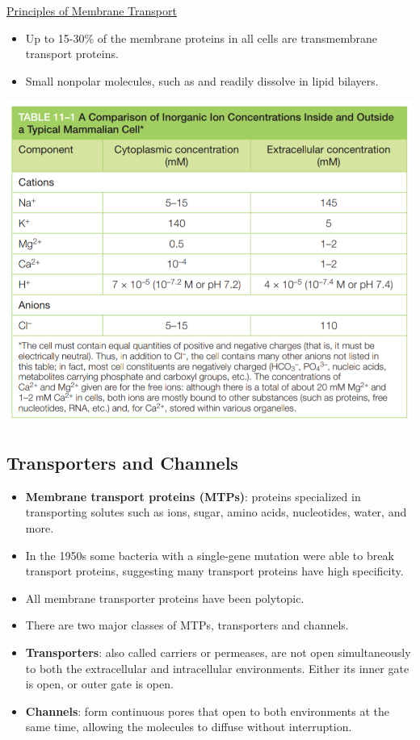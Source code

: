 \documentclass[12pt,letterpaper]{article}
\begin{document}
\hypertarget{11.1}{}
\begin{secbox}{\hyperlink{11}{Principles of Membrane Transport}}{
    \begin{itemize}
        \item Up to 15-30\% of the membrane proteins in all cells are transmembrane transport proteins. 
        \item Small nonpolar molecules, such as  and  readily dissolve in lipid bilayers.
    \end{itemize}
    \begin{center}
        \includegraphics[scale=0.4]{images/tab11-1.png}
    \end{center}
    \vspace{-1cm} 
    \hypertarget{11.1.1}{\subsection*{Transporters and Channels}}
    \begin{itemize}
        \item \textbf{Membrane transport proteins (MTPs)}: proteins specialized in transporting solutes such as ions, sugar, amino acids, nucleotides, water, and more. 
        \item In the 1950s some bacteria with a single-gene mutation were able to break transport proteins, suggesting many transport proteins have high specificity.
        \item All membrane transporter proteins have been polytopic.
        \item There are two major classes of MTPs, transporters and channels.
        \item \textbf{Transporters}: also called carriers or permeases, are not open simultaneously to both the extracellular and intracellular environments. Either its inner gate is open, or outer gate is open.
        \item \textbf{Channels}: form continuous pores that open to both environments at the same time, allowing the molecules to diffuse without interruption.
    \end{itemize}

}
\end{secbox}
\end{document}
